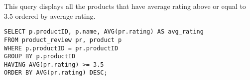 This query displays all the products that have average rating above or equal to 3.5 ordered by average rating.

\begin{lstlisting}
SELECT p.productID, p.name, AVG(pr.rating) AS avg_rating
FROM product_review pr, product p
WHERE p.productID = pr.productID
GROUP BY p.productID
HAVING AVG(pr.rating) >= 3.5
ORDER BY AVG(pr.rating) DESC;
\end{lstlisting}